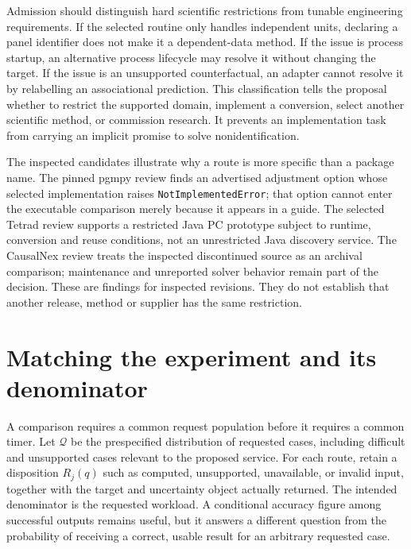 Admission should distinguish hard scientific restrictions from tunable
engineering requirements. If the selected routine only handles independent
units, declaring a panel identifier does not make it a dependent-data method.
If the issue is process startup, an alternative process lifecycle may resolve
it without changing the target. If the issue is an unsupported counterfactual,
an adapter cannot resolve it by relabelling an associational prediction. This
classification tells the proposal whether to restrict the supported domain,
implement a conversion, select another scientific method, or commission
research. It prevents an implementation task from carrying an implicit promise
to solve nonidentification.

The inspected candidates illustrate why a route is more specific than a
package name. The pinned pgmpy review finds an advertised adjustment option
whose selected implementation raises \texttt{NotImplementedError}; that option
cannot enter the executable comparison merely because it appears in a guide.
The selected Tetrad review supports a restricted Java PC prototype subject to
runtime, conversion and reuse conditions, not an unrestricted Java discovery
service. The CausalNex review treats the inspected discontinued source as an
archival comparison; maintenance and unreported solver behavior remain part
of the decision. These are findings for inspected revisions. They do not
establish that another release, method or supplier has the same restriction.
\citep{exec13_pgmpy_reuse_primary,exec13_tetrad_reuse_decision,exec14_causalnex_primary}

\section{Matching the experiment and its denominator}

A comparison requires a common request population before it requires a common
timer. Let \(\mathcal Q\) be the prespecified distribution of requested cases,
including difficult and unsupported cases relevant to the proposed service.
For each route, retain a disposition \(R_j(q)\) such as computed, unsupported,
unavailable, or invalid input, together with the target and uncertainty object
actually returned. The intended denominator is the requested workload. A
conditional accuracy figure among successful outputs remains useful, but it
answers a different question from the probability of receiving a correct,
usable result for an arbitrary requested case.


